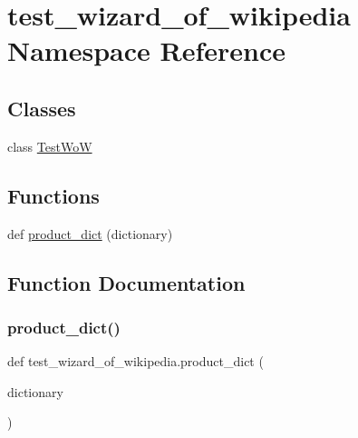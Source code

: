 \hypertarget{namespacetest__wizard__of__wikipedia}{}\section{test\+\_\+wizard\+\_\+of\+\_\+wikipedia Namespace Reference}
\label{namespacetest__wizard__of__wikipedia}
\subsection*{Classes}
\begin{DoxyCompactItemize}
\item 
class \hyperlink{classtest__wizard__of__wikipedia_1_1TestWoW}{Test\+WoW}
\end{DoxyCompactItemize}
\subsection*{Functions}
\begin{DoxyCompactItemize}
\item 
def \hyperlink{namespacetest__wizard__of__wikipedia_a164c55752f617c13303f14f70ac90b0c}{product\+\_\+dict} (dictionary)
\end{DoxyCompactItemize}


\subsection{Function Documentation}
\mbox{\label{namespacetest__wizard__of__wikipedia_a164c55752f617c13303f14f70ac90b0c}} 
\subsubsection{\texorpdfstring{product\+\_\+dict()}{product\_dict()}}
{\footnotesize\ttfamily def test\+\_\+wizard\+\_\+of\+\_\+wikipedia.\+product\+\_\+dict (\begin{DoxyParamCaption}\item[{}]{dictionary }\end{DoxyParamCaption})}

